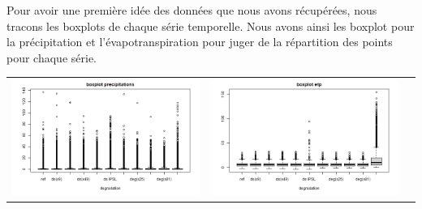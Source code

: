 \documentclass[a4paper,11pt]{article}
\begin{document}
Pour avoir une première idée des données que nous avons récupérées, nous tracons les boxplots de chaque série temporelle.
Nous avons ainsi les boxplot pour la précipitation et l'évapotranspiration pour juger de la répartition des points pour chaque série.

\hspace{-1.2cm}
\begin{tabular}{ccc}
	\includegraphics[scale=0.4]{images/boxplot_precip.png} & \includegraphics[scale=0.4]{images/boxplot_evap.png} \\
\end{tabular} 
\end{document}
